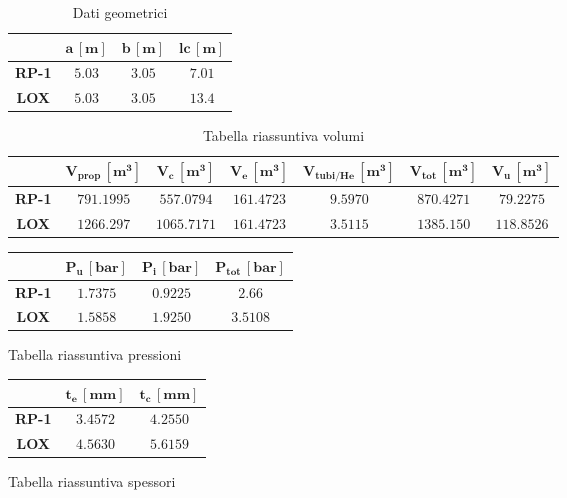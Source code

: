 \begin{table}[H]
\centering
\begin{tabular}{|c|c|c|c|}
\hline
& $\bm{a \, [m]}$ & $\bm{b \, [m]}$ & $\bm{lc \, [m]}$ \\
\hline
\textbf{RP-1} & $5.03$ & $3.05$ & $7.01$ \\
\hline
\textbf{LOX} & $5.03$ & $3.05$ & $13.4$ \\
\hline
\end{tabular}
\caption{Dati geometrici}
\label{table:dati_geometrici}
\end{table}

\begin{table}[H]
\centering
\begin{tabular}{|c|c|c|c|c|c|c|}
\hline
& $\bm{V_{prop} \, [m^3]}$ & $\bm{V_{c} \, [m^3]}$ & $\bm{V_{e} \, [m^3]}$ & $\bm{V_{tubi/He} \, [m^3]}$ & $\bm{V_{tot} \, [m^3]}$ & $\bm{V_{u} \, [m^3]} $\\
\hline
\textbf{RP-1} & $791.1995 $ & $557.0794 $ & $  161.4723 $ & $ 9.5970$ & $ 870.4271$ & $79.2275 $\\
\hline
\textbf{LOX} & $1266.297 $ & $1065.7171 $ & $ 161.4723$ & $3.5115 $ & $ 1385.150$ & $118.8526 $\\
\hline
\end{tabular}
\caption{Tabella riassuntiva volumi}
\label{table:volumi}
\end{table}

\begin{minipage}{0.5\linewidth}
    \centering
    \captionsetup{type=table}
    \begin{tabular}{|c|c|c|c|}
        \hline
        & $\bm{P_{u} \, [bar]}$ & $\bm{P_{i} \, [bar]}$ & $\bm{P_{tot} \, [bar]}$ \\
        \hline
        \textbf{RP-1} & $1.7375$ & $0.9225$ & $2.66$ \\
        \hline
        \textbf{LOX} & $1.5858$ & $1.9250$ & $3.5108$\\
        \hline
    \end{tabular}
    \caption{Tabella riassuntiva pressioni}
    \label{table:pressioni}
\end{minipage}\hfill
\begin{minipage}{0.5\linewidth}
    \centering
    \captionsetup{type=table}
    \begin{tabular}{|c|c|c|}
        \hline
        & $\bm{t_{e} \, [mm]}$ & $\bm{t_{c}\, [mm]}$\\
        \hline
        \textbf{RP-1} & $3.4572$ & $4.2550$\\
        \hline
        \textbf{LOX} & $4.5630$ & $5.6159$\\
        \hline
    \end{tabular}
    \caption{Tabella riassuntiva spessori}
    \label{table:spessori}
\end{minipage}
\vspace*{5pt}

